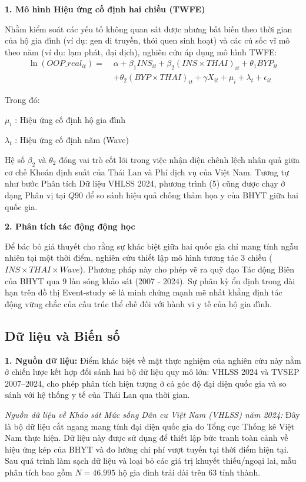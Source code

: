 \documentclass[12pt,a4paper]{article}
\begin{document}
\textbf{1. Mô hình Hiệu ứng cố định hai chiều (TWFE)}

Nhằm kiểm soát các yếu tố không quan sát được nhưng bất biến theo thời gian của hộ gia đình (ví dụ: gen di truyền, thói quen sinh hoạt) và các cú sốc vĩ mô theo năm (ví dụ: lạm phát, đại dịch), nghiên cứu áp dụng mô hình TWFE:
\begin{equation}
	\begin{split}
		\ln(OOP\_real_{it}) = \; & \alpha + \beta_1 INS_{it} 
		+ \beta_2 (INS \times THAI)_{it} 
		+ \theta_1 BYP_{it} \\
		& + \theta_2 (BYP \times THAI)_{it} 
		+ \gamma X_{it} + \mu_i + \lambda_t + \epsilon_{it}
	\end{split}
\end{equation}

Trong đó:

 $\mu_i$ : Hiệu ứng cố định hộ gia đình
 
 $\lambda_t$ : Hiệu ứng cố định năm (Wave)
 
 Hệ số $\beta_2$ và $\theta_2$ đóng vai trò cốt lõi trong việc nhận diện chênh lệch nhân quả giữa cơ chế Khoán định suất của Thái Lan và Phí dịch vụ của Việt Nam. Tương tự như bước Phân tích Dữ liệu VHLSS 2024, phương trình (5) cũng được chạy ở dạng Phân vị tại $Q90$ để so sánh hiệu quả chống thảm họa y của BHYT giữa hai quốc gia.

\textbf{2. Phân tích tác động động học}

Để bác bỏ giả thuyết cho rằng sự khác biệt giữa hai quốc gia chỉ mang tính ngẫu nhiên tại một thời điểm, nghiên cứu thiết lập mô hình tương tác 3 chiều ($INS \times THAI \times Wave$). Phương pháp này cho phép vẽ ra quỹ đạo Tác động Biên của BHYT qua 9 làn sóng khảo sát (2007 - 2024). Sự phân kỳ ổn định trong dài hạn trên đồ thị Event-study sẽ là minh chứng mạnh mẽ nhất khẳng định tác động vững chắc của cấu trúc thể chế đối với hành vi y tế của hộ gia đình.

\subsection{Dữ liệu và Biến số}
\textbf{1. Nguồn dữ liệu:} Điểm khác biệt về mặt thực nghiệm của nghiên cứu này nằm ở chiến lược kết hợp đối sánh hai bộ dữ liệu quy mô lớn: VHLSS 2024 và TVSEP 2007--2024, cho phép phân tích hiện tượng ở cả góc độ đại diện quốc gia và so sánh với hệ thống y tế của Thái Lan qua thời gian.

\textit{Nguồn dữ liệu về Khảo sát Mức sống Dân cư Việt Nam (VHLSS) năm 2024:} 
Đây là bộ dữ liệu cắt ngang mang tính đại diện quốc gia do Tổng cục Thống kê Việt Nam thực hiện. Dữ liệu này được sử dụng để thiết lập bức tranh toàn cảnh về hiệu ứng kép của BHYT và đo lường chi phí vượt tuyến tại thời điểm hiện tại. Sau quá trình làm sạch dữ liệu và loại bỏ các giá trị khuyết thiếu/ngoại lai, mẫu phân tích bao gồm $N = 46.995$ hộ gia đình trải dài trên 63 tỉnh thành.
\end{document}
